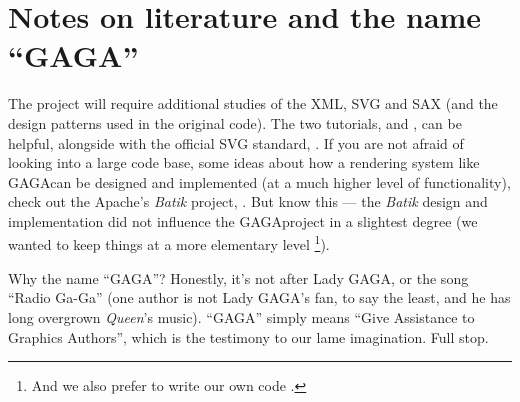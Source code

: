 \documentclass[a4paper]{article}
\newcommand{\forge}{\textsf{GAGA\space}}
\begin{document}
\section*{Notes on literature and the name ``GAGA''} 
\label{sec:notes}

The project will require additional studies of the XML, SVG and SAX (and the design
patterns used in the original code). The two tutorials, \cite{svg-tutorial-1} and
\cite{svg-tutorial-2}, can be helpful, alongside with the official SVG standard, 
\cite{svg-draft}. If you are not afraid of looking into a large code base, some ideas
about how a rendering system like \forge can be designed and implemented (at a much higher
level of functionality), check out the Apache's \emph{Batik} project, \cite{batik}.
But know this --- the \emph{Batik} design and implementation did not influence the
\forge project in a slightest degree (we wanted to keep things at a more elementary level
\footnote{And we also prefer to write our own code {\large\Smiley}.}).

Why the name ``GAGA''? Honestly, it's not after Lady GAGA, or the song
``Radio Ga-Ga'' (one author is not Lady GAGA's fan, to say the least, and he has long
overgrown \emph{Queen}'s music). ``GAGA'' simply means ``Give Assistance to Graphics Authors'',
which is the testimony to our lame imagination. Full stop.

\end{document}
